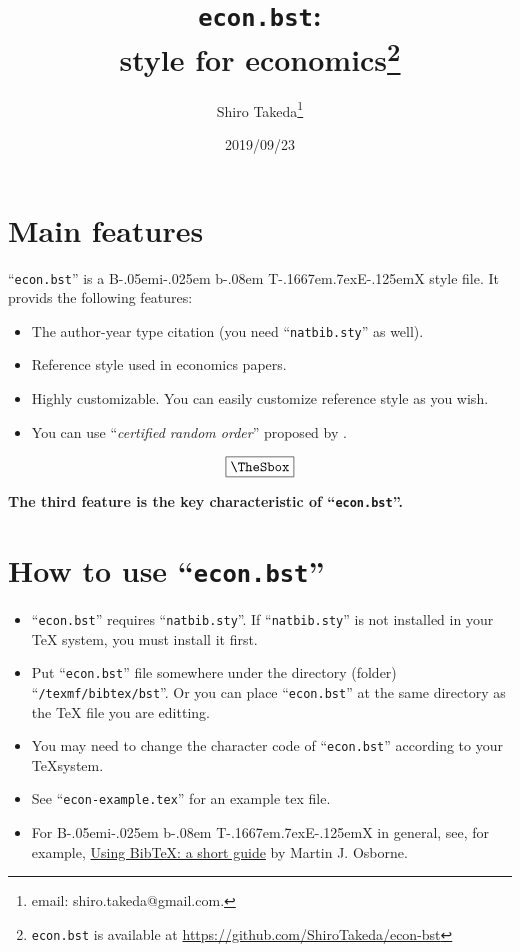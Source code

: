 \documentclass[10pt]{article}
\title{\texttt{econ.bst}:\\
\BibTeX{} style for economics\thanks{\texttt{econ.bst} is available at
\url{https://github.com/ShiroTakeda/econ-bst}}
}
\author{Shiro Takeda\thanks{email: {\ttfamily shiro.takeda@gmail.com}.}}
\date{2019/09/23}
\newenvironment{Frame}%
{\setlength{\fboxsep}{15pt}
\setlength{\mylength}{\linewidth}%
\addtolength{\mylength}{-2\fboxsep}%
\addtolength{\mylength}{-2\fboxrule}%
\Sbox
\minipage{\mylength}%
\setlength{\abovedisplayskip}{0pt}%
\setlength{\belowdisplayskip}{0pt}%
}%
{\endminipage\endSbox
\[\fbox{\TheSbox}\]}
\def\BibTeX{{\rm B\kern-.05em{\sc i\kern-.025em b}\kern-.08em
    T\kern-.1667em\lower.7ex\hbox{E}\kern-.125emX}}
\begin{document}
\maketitle

\newlength{\mylength}
\setlength{\fboxsep}{15pt}
\setlength{\mylength}{\linewidth}
\addtolength{\mylength}{-2\fboxsep}
\addtolength{\mylength}{-2\fboxrule}

\tableofcontents


\setlength{\baselineskip}{16pt}

\section{Main features}

``\texttt{econ.bst}'' is a \BibTeX{} style file. It provids the following
features:
\begin{Frame}
 \begin{itemize}
  \item The author-year type citation (you need ``\texttt{natbib.sty}'' as well).
  \item Reference style used in economics papers.
  \item Highly customizable.  You can easily customize reference style as you
        wish.
  \item You can use ``\textit{certified random order}'' proposed by
        \href{http://dx.doi.org/10.1257/aer.20161492}{\citet[][AER]{10.1257/aer.20161492}}.
 \end{itemize}
\end{Frame}

\textbf{The third feature is the key characteristic of ``\texttt{econ.bst}''.}

\section{How to use ``\texttt{econ.bst}''}

\begin{itemize}
 \item ``\texttt{econ.bst}'' requires ``\texttt{natbib.sty}''. 
       If ``\texttt{natbib.sty}'' is not installed in your \TeX{} system, you must
       install it first.
 \item Put ``\texttt{econ.bst}'' file somewhere under the directory (folder)
       ``\texttt{/texmf/bibtex/bst}''. Or you can place ``\texttt{econ.bst}'' at
       the same directory as the \TeX{} file you are editting.
 \item You may need to change the character code of ``\texttt{econ.bst}''
       according to your \TeX system.
 \item See ``\texttt{econ-example.tex}'' for an example tex file.
 \item For \BibTeX{} in general, see, for example,
       \href{https://www.economics.utoronto.ca/osborne/latex/BIBTEX.HTM}{Using
       BibTeX: a short guide} by Martin J. Osborne.
\end{itemize}
\end{document}
